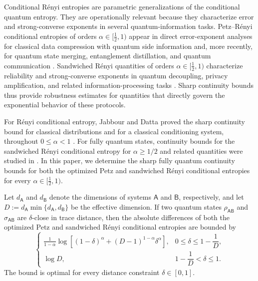 \documentclass[11pt,reqno]{amsart}
\theoremstyle{definition}
\newcommand{\A}{\mathsf{A}}
\newcommand{\B}{\mathsf{B}}
\begin{document}
Conditional R\'enyi entropies are parametric generalizations of the conditional quantum entropy.
They are operationally relevant because they characterize error and
strong-converse exponents in several quantum-information tasks.
Petz--R\'enyi conditional entropies of orders $\alpha\in[\frac12,1)$ appear in direct
error-exponent analyses for classical data compression with quantum side
information \cite{CHDH-2018, Ren25, preparation} and, more recently, for quantum state merging,
entanglement distillation, and quantum communication
\cite{BertaChengYao2026}. 
Sandwiched R\'enyi quantities of orders
$\alpha\in[\frac12,1)$ characterize reliability and strong-converse
exponents in quantum decoupling, privacy amplification, and related
information-processing tasks
\cite{LY21a,LY24a,BertaChengYao2026,CDG24,RegulaTomamichel2026}.  
Sharp continuity bounds thus
provide robustness estimates for quantities that directly govern
the exponential behavior of these protocols.

For R\'enyi conditional entropy, Jabbour and Datta proved the sharp
continuity bound for classical distributions and for a classical
conditioning system, throughout $0\leq\alpha<1$
\cite{JabbourDatta2022}.  
For fully quantum states, continuity bounds for
the sandwiched R\'enyi conditional entropy for $\alpha \geq 1/2$ and related quantities were
studied in \cite{MarwahDupuis2022,BeigiGoodarzi2023,BluhmCapelGondolfMoebus2026}.
In this paper, we determine the sharp
fully quantum continuity bounds for both the optimized Petz and sandwiched
R\'enyi conditional entropies for every
$\alpha\in[\frac12,1)$.

Let $d_{\A}$ and $d_{\B}$ denote the dimensions of systems $\A$ and
$\B$, respectively, and let
$D:=d_{\A}\min\{d_{\A},d_{\B}\}$ be the effective dimension.
If two quantum states $\rho_{\A\B}$ and $\sigma_{\A\B}$ are $\delta$-close in trace distance, then the absolute differences of both the
optimized Petz and sandwiched R\'enyi conditional entropies are bounded by
\begin{equation}\label{eq:introduction-modulus}
 \begin{cases}
 \displaystyle
 \frac{1}{1-\alpha}
 \log\!\left[
 (1-\delta)^\alpha
 +(D-1)^{1-\alpha}\delta^\alpha
 \right],
 &
 0\leq\delta\leq1-\dfrac1D,
 \\[3mm]
 \log D,
 &
 1-\dfrac1D<\delta\leq1.
 \end{cases}
\end{equation}
The bound is optimal for every distance constraint $\delta \in [0,1]$.  
\end{document}
